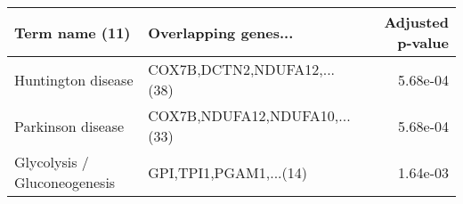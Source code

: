 \begin{tabular}{llr}
\toprule
              Term name (11) &          Overlapping genes... &  Adjusted p-value \\
\midrule
          Huntington disease &   COX7B,DCTN2,NDUFA12,...(38) &          5.68e-04 \\
           Parkinson disease & COX7B,NDUFA12,NDUFA10,...(33) &          5.68e-04 \\
Glycolysis / Gluconeogenesis &        GPI,TPI1,PGAM1,...(14) &          1.64e-03 \\
\bottomrule
\end{tabular}
